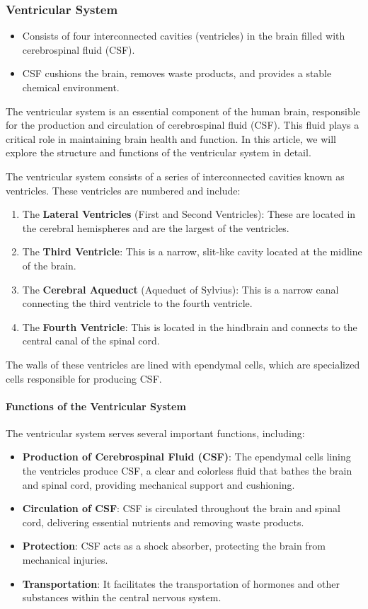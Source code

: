 \documentclass{article}
\begin{document}
\subsubsection{Ventricular System}
\begin{itemize}
    \item Consists of four interconnected cavities (ventricles) in the brain filled with cerebrospinal fluid (CSF).
    \item CSF cushions the brain, removes waste products, and provides a stable chemical environment.
\end{itemize}
The ventricular system is an essential component of the human brain, responsible for the production and circulation of cerebrospinal fluid (CSF). This fluid plays a critical role in maintaining brain health and function. In this article, we will explore the structure and functions of the ventricular system in detail.

The ventricular system consists of a series of interconnected cavities known as ventricles. These ventricles are numbered and include:

\begin{enumerate}
  \item The \textbf{Lateral Ventricles} (First and Second Ventricles): These are located in the cerebral hemispheres and are the largest of the ventricles.
  \item The \textbf{Third Ventricle}: This is a narrow, slit-like cavity located at the midline of the brain.
  \item The \textbf{Cerebral Aqueduct} (Aqueduct of Sylvius): This is a narrow canal connecting the third ventricle to the fourth ventricle.
  \item The \textbf{Fourth Ventricle}: This is located in the hindbrain and connects to the central canal of the spinal cord.
\end{enumerate}

The walls of these ventricles are lined with ependymal cells, which are specialized cells responsible for producing CSF.
\paragraph{Functions of the Ventricular System}

The ventricular system serves several important functions, including:

\begin{itemize}
  \item \textbf{Production of Cerebrospinal Fluid (CSF)}: The ependymal cells lining the ventricles produce CSF, a clear and colorless fluid that bathes the brain and spinal cord, providing mechanical support and cushioning.
  \item \textbf{Circulation of CSF}: CSF is circulated throughout the brain and spinal cord, delivering essential nutrients and removing waste products.
  \item \textbf{Protection}: CSF acts as a shock absorber, protecting the brain from mechanical injuries.
  \item \textbf{Transportation}: It facilitates the transportation of hormones and other substances within the central nervous system.
\end{itemize}
\end{document}
